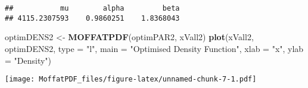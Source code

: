 \documentclass[
]{article}
\newenvironment{Shaded}{\begin{snugshade}}{\end{snugshade}}
\newcommand{\AttributeTok}[1]{\textcolor[rgb]{0.13,0.29,0.53}{#1}}
\newcommand{\FunctionTok}[1]{\textcolor[rgb]{0.13,0.29,0.53}{\textbf{#1}}}
\newcommand{\NormalTok}[1]{#1}
\newcommand{\OtherTok}[1]{\textcolor[rgb]{0.56,0.35,0.01}{#1}}
\newcommand{\StringTok}[1]{\textcolor[rgb]{0.31,0.60,0.02}{#1}}
\begin{document}
\begin{verbatim}
##           mu        alpha         beta 
## 4115.2307593    0.9860251    1.8368043
\end{verbatim}

\begin{Shaded}
\begin{Highlighting}[]
\NormalTok{optimDENS2 }\OtherTok{\textless{}{-}} \FunctionTok{MOFFATPDF}\NormalTok{(optimPAR2, xVall2)}
\FunctionTok{plot}\NormalTok{(xVall2, optimDENS2, }\AttributeTok{type =} \StringTok{"l"}\NormalTok{, }\AttributeTok{main =} \StringTok{"Optimised Density Function"}\NormalTok{, }\AttributeTok{xlab =} \StringTok{"x"}\NormalTok{, }\AttributeTok{ylab =} \StringTok{"Density"}\NormalTok{)}
\end{Highlighting}
\end{Shaded}

\texttt{[image: MoffatPDF\_files/figure-latex/unnamed-chunk-7-1.pdf]}
\end{document}
